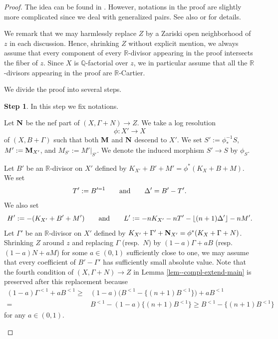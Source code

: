 \documentclass[12pt]{amsart}
\theoremstyle{definition}
\newtheorem{step1}{Step}
\begin{document}
\begin{proof}
The idea can be found in \cite[Proof of Proposition 8.1]{birkar-compl}. 
However, notations in the proof are slightly more complicated since we deal with generalized pairs. 
See also \cite[Proof of Proposition 4.1]{filipazzi-moraga} or \cite[Proof of Proposition 3.5]{chhx-compl} for details. 

We remark that we may harmlessly replace $Z$ by a Zariski open neighborhood of $z$ in each discussion. 
Hence, shrinking $Z$ without explicit mention, we always assume that every component of every $\mathbb{R}$-divisor appearing in the proof intersects the fiber of $z$. 
Since $X$ is $\mathbb{Q}$-factorial over $z$, we in particular assume that all the $\mathbb{R}$-divisors appearing in the proof are $\mathbb{R}$-Cartier. 

We divide the proof into several steps. 

\begin{step1}\label{step1--lem-compl-extend-main}
In this step we fix notations. 

Let $\boldsymbol{\rm N}$ be the nef part of $(X,\Gamma+N) \to Z$. 
We take a log resolution 
$$\phi \colon X' \to X$$
of $(X,B+\Gamma)$ such that both $\boldsymbol{\rm M}$ and $\boldsymbol{\rm N}$ descend to $X'$. 
We set $S':=\phi^{-1}_{*} S$, $M':=\boldsymbol{\rm M}_{X'}$, and $M_{S'}:=M'|_{S'}$. 
We denote the induced morphism $S' \to S$ by $\phi_{S}$. 

Let $B'$ be an $\mathbb{R}$-divisor on $X'$ defined by $K_{X'}+B'+M'=\phi^{*}(K_{X}+B+M)$. 
We set
\begin{equation}\label{lem--compl-extend-main-(TDelta)}
T':=B'^{=1} \qquad {\rm and}\qquad \Delta'= B'-T'.
\end{equation}
We also set
\begin{equation}\label{lem--compl-extend-main-(LH)}
H':=-(K_{X'}+B'+M') \qquad {\rm and}\qquad L':=-nK_{X'}-nT'-\lfloor (n+1)\Delta'\rfloor-nM'.
\end{equation}
Let $\Gamma'$ be an $\mathbb{R}$-divisor on $X'$ defined by $K_{X'}+\Gamma'+\boldsymbol{\rm N}_{X'}=\phi^{*}(K_{X}+\Gamma+N)$. 
Shrinking $Z$ around $z$ and replacing $\Gamma$ (resp.~$N$) by $(1-a)\Gamma+aB$ (resp.~$(1-a)N+aM$)  for some $a \in (0,1)$ sufficiently close to one, we may assume that every coefficient of $B'-\Gamma'$ has sufficiently small absolute value. 
Note that the fourth condition of $(X,\Gamma+N) \to Z$ in Lemma \ref{lem--compl-extend-main} is preserved after this replacement because 
\begin{equation*}
\begin{split}
(1-a)\Gamma^{<1}+aB^{<1} \geq & (1-a)\bigl(B^{<1}-\{(n+1)B^{<1}\}\bigr)+aB^{<1}\\
=&B^{<1}-(1-a)\{(n+1)B^{<1}\}\geq B^{<1}-\{(n+1)B^{<1}\} 
\end{split}
\end{equation*}
for any $a \in (0,1)$. 
\end{step1}


\end{proof}
\end{document}
